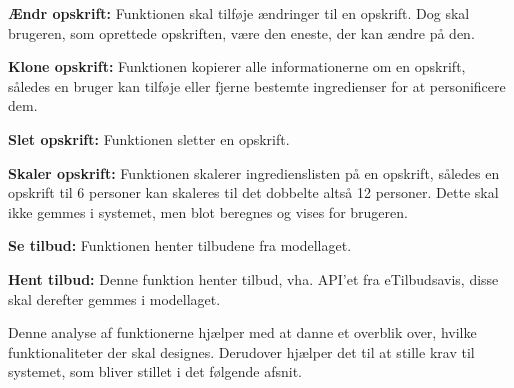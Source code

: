 \textbf{Ændr opskrift:} Funktionen skal tilføje ændringer til en opskrift. Dog skal brugeren, som oprettede opskriften, være den eneste, der kan ændre på den. 

\textbf{Klone opskrift:} Funktionen kopierer alle informationerne om en opskrift, således en bruger kan tilføje eller fjerne bestemte ingredienser for at personificere dem.

\textbf{Slet opskrift:} Funktionen sletter en opskrift.

\textbf{Skaler opskrift:} Funktionen skalerer ingredienslisten på en opskrift, således en opskrift til 6 personer kan skaleres til det dobbelte altså 12 personer. Dette skal ikke gemmes i systemet, men blot beregnes og vises for brugeren.		

\textbf{Se tilbud:} Funktionen henter tilbudene fra modellaget.

\textbf{Hent tilbud:} Denne funktion henter tilbud, vha. API'et fra eTilbudsavis, disse skal derefter gemmes i modellaget.


Denne analyse af funktionerne hjælper med at danne et overblik over, hvilke funktionaliteter der skal designes.
Derudover hjælper det til at stille krav til systemet, som bliver stillet i det følgende afsnit.

